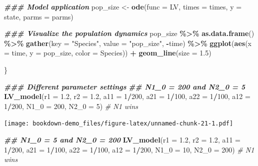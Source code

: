 \documentclass[
]{book}
\newenvironment{Shaded}{\begin{snugshade}}{\end{snugshade}}
\newcommand{\AttributeTok}[1]{\textcolor[rgb]{0.13,0.29,0.53}{#1}}
\newcommand{\CommentTok}[1]{\textcolor[rgb]{0.56,0.35,0.01}{\textit{#1}}}
\newcommand{\DecValTok}[1]{\textcolor[rgb]{0.00,0.00,0.81}{#1}}
\newcommand{\DocumentationTok}[1]{\textcolor[rgb]{0.56,0.35,0.01}{\textbf{\textit{#1}}}}
\newcommand{\FloatTok}[1]{\textcolor[rgb]{0.00,0.00,0.81}{#1}}
\newcommand{\FunctionTok}[1]{\textcolor[rgb]{0.13,0.29,0.53}{\textbf{#1}}}
\newcommand{\NormalTok}[1]{#1}
\newcommand{\OtherTok}[1]{\textcolor[rgb]{0.56,0.35,0.01}{#1}}
\newcommand{\SpecialCharTok}[1]{\textcolor[rgb]{0.81,0.36,0.00}{\textbf{#1}}}
\newcommand{\StringTok}[1]{\textcolor[rgb]{0.31,0.60,0.02}{#1}}
\begin{document}
\begin{Shaded}
\begin{Highlighting}[]
  \DocumentationTok{\#\#\# Model application}
\NormalTok{  pop\_size }\OtherTok{\textless{}{-}} \FunctionTok{ode}\NormalTok{(}\AttributeTok{func =}\NormalTok{ LV, }\AttributeTok{times =}\NormalTok{ times, }\AttributeTok{y =}\NormalTok{ state, }\AttributeTok{parms =}\NormalTok{ parms)}

  \DocumentationTok{\#\#\# Visualize the population dynamics}
\NormalTok{  pop\_size }\SpecialCharTok{\%\textgreater{}\%}
    \FunctionTok{as.data.frame}\NormalTok{() }\SpecialCharTok{\%\textgreater{}\%}
    \FunctionTok{gather}\NormalTok{(}\AttributeTok{key =} \StringTok{"Species"}\NormalTok{, }\AttributeTok{value =} \StringTok{"pop\_size"}\NormalTok{, }\SpecialCharTok{{-}}\NormalTok{time) }\SpecialCharTok{\%\textgreater{}\%}
    \FunctionTok{ggplot}\NormalTok{(}\FunctionTok{aes}\NormalTok{(}\AttributeTok{x =}\NormalTok{ time, }\AttributeTok{y =}\NormalTok{ pop\_size, }\AttributeTok{color =}\NormalTok{ Species)) }\SpecialCharTok{+}
    \FunctionTok{geom\_line}\NormalTok{(}\AttributeTok{size =} \FloatTok{1.5}\NormalTok{)}

\NormalTok{\}}

  \DocumentationTok{\#\#\# Different parameter settings}
  \DocumentationTok{\#\# N1\_0 = 200 and N2\_0 = 5}
  \FunctionTok{LV\_model}\NormalTok{(}\AttributeTok{r1 =} \FloatTok{1.2}\NormalTok{, }\AttributeTok{r2 =} \FloatTok{1.2}\NormalTok{, }\AttributeTok{a11 =} \DecValTok{1}\SpecialCharTok{/}\DecValTok{200}\NormalTok{, }\AttributeTok{a21 =} \DecValTok{1}\SpecialCharTok{/}\DecValTok{100}\NormalTok{, }\AttributeTok{a22 =} \DecValTok{1}\SpecialCharTok{/}\DecValTok{100}\NormalTok{, }\AttributeTok{a12 =} \DecValTok{1}\SpecialCharTok{/}\DecValTok{200}\NormalTok{, }\AttributeTok{N1\_0 =} \DecValTok{200}\NormalTok{, }\AttributeTok{N2\_0 =} \DecValTok{5}\NormalTok{)  }\CommentTok{\# N1 wins}
\end{Highlighting}
\end{Shaded}

\texttt{[image: bookdown-demo\_files/figure-latex/unnamed-chunk-21-1.pdf]}

\begin{Shaded}
\begin{Highlighting}[]
  \DocumentationTok{\#\# N1\_0 = 5 and N2\_0 = 200}
  \FunctionTok{LV\_model}\NormalTok{(}\AttributeTok{r1 =} \FloatTok{1.2}\NormalTok{, }\AttributeTok{r2 =} \FloatTok{1.2}\NormalTok{, }\AttributeTok{a11 =} \DecValTok{1}\SpecialCharTok{/}\DecValTok{200}\NormalTok{, }\AttributeTok{a21 =} \DecValTok{1}\SpecialCharTok{/}\DecValTok{100}\NormalTok{, }\AttributeTok{a22 =} \DecValTok{1}\SpecialCharTok{/}\DecValTok{100}\NormalTok{, }\AttributeTok{a12 =} \DecValTok{1}\SpecialCharTok{/}\DecValTok{200}\NormalTok{, }\AttributeTok{N1\_0 =} \DecValTok{10}\NormalTok{, }\AttributeTok{N2\_0 =} \DecValTok{200}\NormalTok{)  }\CommentTok{\# N1 wins}
\end{Highlighting}
\end{Shaded}
\end{document}
